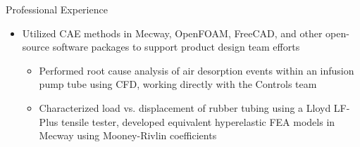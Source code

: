 \begin{rSection}{Professional Experience}
    \vspace{-0.5em}
    \begin{itemize}[label={\tiny\raisebox{1ex}{\textbullet}}, noitemsep]
        \item Utilized CAE methods in Mecway, OpenFOAM, FreeCAD, and other open-source software packages to support product design team efforts
        \begin{itemize}[label={\tiny\raisebox{1ex}{\textbullet}}, noitemsep]
            \item Performed root cause analysis of air desorption events within an infusion pump tube using CFD, working directly with the Controls team 
            \item Characterized load vs. displacement of rubber tubing using a Lloyd LF-Plus tensile tester, developed equivalent hyperelastic FEA models in Mecway using Mooney-Rivlin coefficients
        \end{itemize}{}
    \end{itemize}{}
    \vspace{-0.4em}
\end{rSection}
